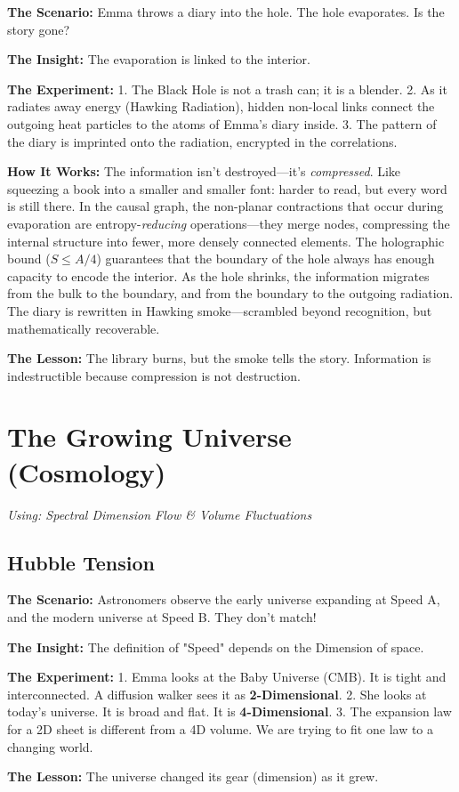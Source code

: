 \documentclass[11pt, a4paper, openany]{book}
\begin{document}
\begin{thoughtexp}
\textbf{The Scenario:} Emma throws a diary into the hole. The hole evaporates. Is the story gone?

\textbf{The Insight:} The evaporation is linked to the interior.

\textbf{The Experiment:}
1. The Black Hole is not a trash can; it is a blender.
2. As it radiates away energy (Hawking Radiation), hidden non-local links connect the outgoing heat particles to the atoms of Emma's diary inside.
3. The pattern of the diary is imprinted onto the radiation, encrypted in the correlations.

\textbf{How It Works:} The information isn't destroyed---it's \emph{compressed}. Like squeezing a book into a smaller and smaller font: harder to read, but every word is still there. In the causal graph, the non-planar contractions that occur during evaporation are entropy-\emph{reducing} operations---they merge nodes, compressing the internal structure into fewer, more densely connected elements. The holographic bound ($S \le A/4$) guarantees that the boundary of the hole always has enough capacity to encode the interior. As the hole shrinks, the information migrates from the bulk to the boundary, and from the boundary to the outgoing radiation. The diary is rewritten in Hawking smoke---scrambled beyond recognition, but mathematically recoverable.

\textbf{The Lesson:} The library burns, but the smoke tells the story. Information is indestructible because compression is not destruction.
\end{thoughtexp}

\chapter{The Growing Universe (Cosmology)}
\textit{Using: Spectral Dimension Flow \& Volume Fluctuations}

\section{Hubble Tension}
\begin{thoughtexp}
\textbf{The Scenario:} Astronomers observe the early universe expanding at Speed A, and the modern universe at Speed B. They don't match!

\textbf{The Insight:} The definition of "Speed" depends on the Dimension of space.

\textbf{The Experiment:}
1. Emma looks at the Baby Universe (CMB). It is tight and interconnected. A diffusion walker sees it as \textbf{2-Dimensional}.
2. She looks at today's universe. It is broad and flat. It is \textbf{4-Dimensional}.
3. The expansion law for a 2D sheet is different from a 4D volume. We are trying to fit one law to a changing world.

\textbf{The Lesson:} The universe changed its gear (dimension) as it grew.
\end{thoughtexp}
\end{document}
